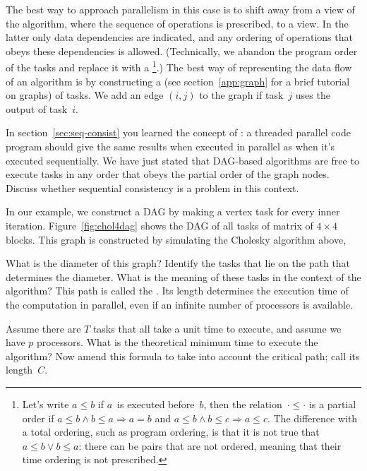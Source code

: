 The best way to approach parallelism in this case is to shift away
from a  view of the algorithm, where the
sequence of operations is prescribed, to a  view.
In the latter only data dependencies are indicated, and any ordering of
operations that obeys these dependencies is allowed. (Technically, we
abandon the program order of the tasks and replace it with a
\footnote{Let's write $a\leq b$ if $a$~is
  executed before~$b$, then the relation~$\cdot\leq\cdot$ is a partial
  order if $a\leq b\wedge b\leq a\Rightarrow a=b$ and $a\leq b\wedge
  b\leq c\Rightarrow a\leq c$. The difference with a total ordering,
  such as program ordering, is that it is not true that $a\leq b\vee
  b\leq a$: there can be pairs that are not ordered, meaning that
  their time ordering is not prescribed.}.)  The best way of
representing the data flow of an algorithm is by constructing a
 (see section~\ref{app:graph} for a brief tutorial on
graphs) of tasks.  We add an edge $(i,j)$ to the graph if task~$j$
uses the output of task~$i$.

\begin{exercise}
  In section~\ref{sec:seq-consist} you learned the concept of
  : a threaded parallel code program
  should give the same results when executed in parallel as when it's
  executed sequentially. We have just stated that \ac{DAG}-based
  algorithms are free to execute tasks in any order that obeys the
  partial order of the graph nodes. Discuss whether
  sequential consistency is a problem in this context.
\end{exercise}

In our example, we construct a \ac{DAG} by making a vertex task for every
inner iteration.
Figure~\ref{fig:chol4dag} shows the \ac{DAG} of all tasks
of matrix of $4\times4$ blocks. This graph is constructed by
simulating the Cholesky algorithm above, 

\begin{exercise}
  What is the diameter of this graph? Identify the tasks that lie on
  the path that determines the diameter. What is the meaning of these
  tasks in the context of the algorithm? This path is called the
  . Its length determines the execution time of the
  computation in parallel, even if an infinite number of processors is
  available.
\end{exercise}

\begin{exercise}
  Assume there are $T$ tasks that all take a unit time to execute, and
  assume we have $p$ processors. What is the
  theoretical minimum time to execute the algorithm? Now amend this
  formula to take into account the critical path; call its length~$C$.
\end{exercise}

